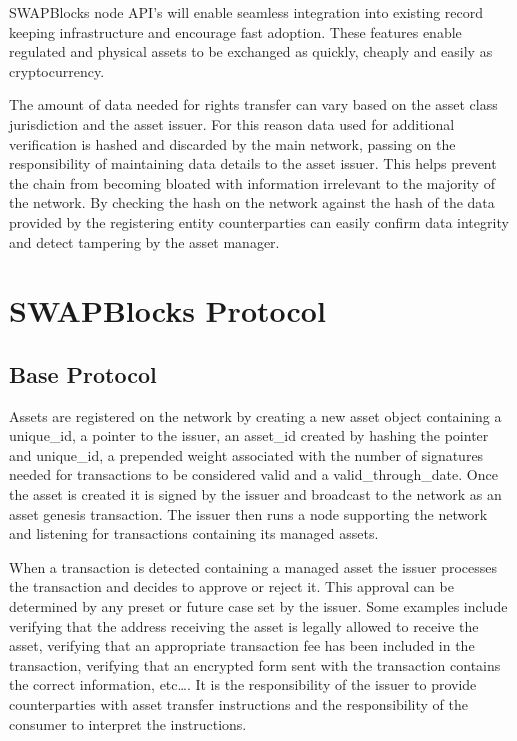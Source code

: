 \documentclass[12pt]{article}
\begin{document}
SWAPBlocks node API’s will enable seamless integration into 
existing record keeping infrastructure and encourage fast adoption. These 
features enable regulated and physical assets to be exchanged as quickly, cheaply
and easily as cryptocurrency.

The amount of data needed for rights transfer can vary based on the asset class
jurisdiction and the asset issuer.
For this reason data used for additional verification is hashed and discarded by the
main network, passing on the responsibility of maintaining data details to
the asset issuer. 
This helps prevent the chain from becoming bloated with information irrelevant 
to the majority of the network.  By checking the hash on the network against 
the hash of the data provided by the registering entity counterparties can easily 
confirm data integrity and detect tampering by the asset manager.


\section{SWAPBlocks Protocol}
\subsection{Base Protocol}
Assets are registered on the network by creating a new asset object containing 
a unique\_id, a pointer to the issuer, an asset\_id created by hashing the pointer 
and unique\_id, a prepended weight associated with the number of signatures needed 
for transactions to be considered valid and a valid\_through\_date.  Once the asset 
is created it is signed by the issuer and broadcast to the network as an asset 
genesis transaction. The issuer then runs a node supporting the network and listening 
for transactions containing its managed assets.

When a transaction is detected containing a managed asset the issuer processes the 
transaction and decides to approve or reject it.  This approval can be 
determined by any preset or future case set by the issuer.  Some examples include 
verifying that the address receiving the asset is legally allowed to receive the asset, 
verifying that an appropriate transaction fee has been included in the transaction, 
verifying that an encrypted form sent with the transaction contains the correct 
information, etc….  It is the responsibility of the issuer to provide counterparties with 
asset transfer instructions and the responsibility of the consumer to interpret
the instructions.
\end{document}
